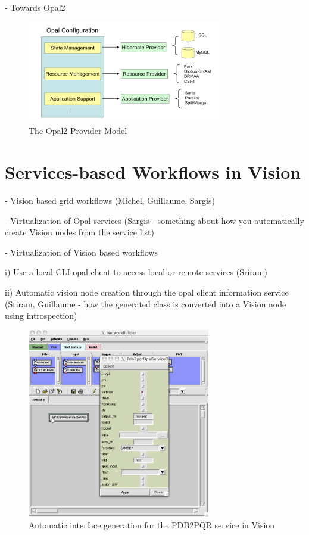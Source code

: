 \documentclass[conference]{IEEEtran}
\begin{document}
- Towards Opal2

\begin{figure}
\begin{center}
\includegraphics[width=8.5cm]{opal2-providers}
\end{center}
\caption{The Opal2 Provider Model}
\label{fig:opal2-providers}
\end{figure}

\section {Services-based Workflows in Vision}

- Vision based grid workflows (Michel, Guillaume, Sargis)

- Virtualization of Opal services (Sargis - something about how you
automatically create Vision nodes from the service list)

- Virtualization of Vision based workflows

  i) Use a local CLI opal client to access local or remote services (Sriram)

 ii) Automatic vision node creation through the opal client information
 service (Sriram, Guillaume - how the generated class is converted into a Vision node using introspection)

\begin{figure}
\begin{center}
\includegraphics[width=8cm]{vision-gui}
\end{center}
\caption{Automatic interface generation for the PDB2PQR service in Vision}
\label{fig:vision-gui}
\end{figure}
\end{document}
